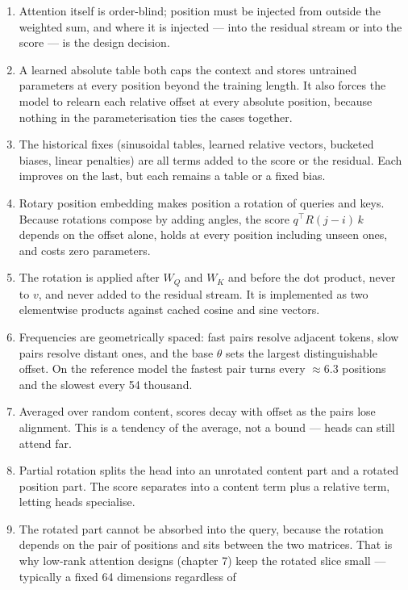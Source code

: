 \begin{enumerate}
\def\labelenumi{\arabic{enumi}.}
\tightlist
\item
  Attention itself is order-blind; position must be injected from
  outside the weighted sum, and where it is injected --- into the
  residual stream or into the score --- is the design decision.
\item
  A learned absolute table both caps the context and stores untrained
  parameters at every position beyond the training length. It also
  forces the model to relearn each relative offset at every absolute
  position, because nothing in the parameterisation ties the cases
  together.
\item
  The historical fixes (sinusoidal tables, learned relative vectors,
  bucketed biases, linear penalties) are all terms added to the score or
  the residual. Each improves on the last, but each remains a table or a
  fixed bias.
\item
  Rotary position embedding makes position a rotation of queries and
  keys. Because rotations compose by adding angles, the score
  \(q^{\top} R(j-i)\, k\) depends on the offset alone, holds at every
  position including unseen ones, and costs zero parameters.
\item
  The rotation is applied after \(W_Q\) and \(W_K\) and before the dot
  product, never to \(v\), and never added to the residual stream. It is
  implemented as two elementwise products against cached cosine and sine
  vectors.
\item
  Frequencies are geometrically spaced: fast pairs resolve adjacent
  tokens, slow pairs resolve distant ones, and the base \(\theta\) sets
  the largest distinguishable offset. On the reference model the fastest
  pair turns every \(\approx 6.3\) positions and the slowest every 54
  thousand.
\item
  Averaged over random content, scores decay with offset as the pairs
  lose alignment. This is a tendency of the average, not a bound ---
  heads can still attend far.
\item
  Partial rotation splits the head into an unrotated content part and a
  rotated position part. The score separates into a content term plus a
  relative term, letting heads specialise.
\item
  The rotated part cannot be absorbed into the query, because the
  rotation depends on the pair of positions and sits between the two
  matrices. That is why low-rank attention designs (chapter 7) keep the
  rotated slice small --- typically a fixed 64 dimensions regardless of

\end{enumerate}
